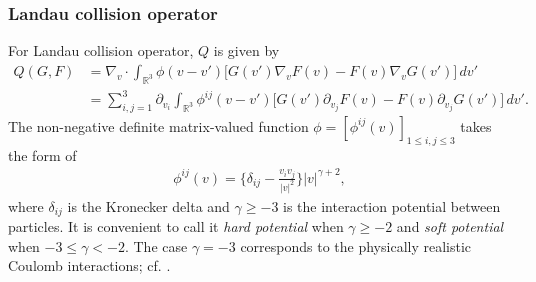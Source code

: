 \documentclass[reqno,a4paper]{amsart}
\numberwithin{equation}{section}
\newcommand{\1}{\mathbf{1}}
\newcommand{\R}{\mathbb{R}}
\newcommand{\<}{\langle}
\renewcommand{\>}{\rangle}
\begin{document}
\subsubsection{Landau collision operator} 
	For Landau collision operator, $Q$ is given by 
	\begin{align*}
		Q(G,F)&=\nabla_v\cdot\int_{\R^3}\phi(v-v')\big[G(v')\nabla_vF(v)-F(v)\nabla_vG(v')\big]\,dv'\\
		&=\sum^3_{i,j=1}\partial_{v_i}\int_{\R^3}\phi^{ij}(v-v')\big[G(v')\partial_{v_j}F(v)-F(v)\partial_{v_j}G(v')\big]\,dv'.
	\end{align*}
	The non-negative definite matrix-valued function $\phi=[\phi^{ij}(v)]_{1\leq i,j\leq 3}$ takes the form of 
	\begin{align*}
		\phi^{ij}(v) = \Big\{\delta_{ij}-\frac{v_iv_j}{|v|^2}\Big\}|v|^{\gamma+2},
	\end{align*}
where $\delta_{ij}$ is the Kronecker delta and $\gamma\ge -3$ is the interaction potential between particles. It is convenient to call it {\em hard potential} when $\gamma\ge -2$ and {\em soft potential} when $-3\le\gamma<-2$. The case $\gamma=-3$ corresponds to the physically realistic Coulomb interactions; cf. \cite{Guo2002a}. 
	
\end{document}
